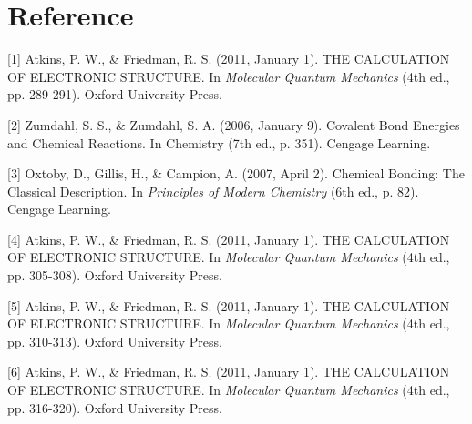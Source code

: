 \documentclass[%
 reprint,
 amsmath,amssymb,
 aps,
]{revtex4-2}
\begin{document}
\section{\label{sec:level1}Reference}
[1] Atkins, P. W., \& Friedman, R. S. (2011, January 1). THE CALCULATION OF ELECTRONIC STRUCTURE. In \textit{Molecular Quantum Mechanics} (4th ed., pp. 289-291). Oxford University Press.

[2] Zumdahl, S. S., \& Zumdahl, S. A. (2006, January 9). Covalent Bond Energies and Chemical Reactions. In Chemistry (7th ed., p. 351). Cengage Learning.

[3] Oxtoby, D., Gillis, H., \& Campion, A. (2007, April 2). Chemical Bonding: The Classical Description. In \textit{Principles of Modern Chemistry} (6th ed., p. 82). Cengage Learning.

[4] Atkins, P. W., \& Friedman, R. S. (2011, January 1). THE CALCULATION OF ELECTRONIC STRUCTURE. In \textit{Molecular Quantum Mechanics} (4th ed., pp. 305-308). Oxford University Press.

[5] Atkins, P. W., \& Friedman, R. S. (2011, January 1). THE CALCULATION OF ELECTRONIC STRUCTURE. In \textit{Molecular Quantum Mechanics} (4th ed., pp. 310-313). Oxford University Press.

[6] Atkins, P. W., \& Friedman, R. S. (2011, January 1). THE CALCULATION OF ELECTRONIC STRUCTURE. In \textit{Molecular Quantum Mechanics} (4th ed., pp. 316-320). Oxford University Press.
\end{document}
